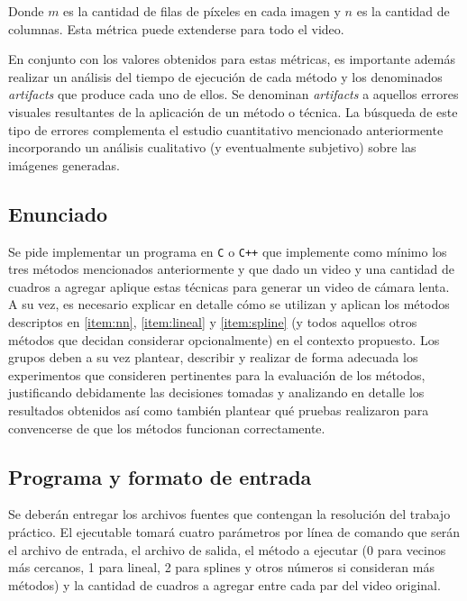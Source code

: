     Donde $m$ es la cantidad de filas de p\'ixeles en cada imagen y $n$ es la cantidad de columnas. Esta métrica puede extenderse para todo el video.

    En conjunto con los valores obtenidos para estas m\'etricas, es importante además realizar un an\'alisis del tiempo de ejecuci\'on de cada m\'etodo y los denominados \emph{artifacts} que produce cada uno de ellos. Se denominan \emph{artifacts} a aquellos errores visuales resultantes de la aplicaci\'on de un m\'etodo o t\'ecnica. La b\'usqueda de este tipo de errores complementa el estudio cuantitativo mencionado anteriormente incorporando un an\'alisis cualitativo (y eventualmente subjetivo) sobre las im\'agenes generadas.

    \vskip 5pt

    \subsection{Enunciado}

    Se pide implementar un programa en \verb-C- o \verb-C++- que implemente como m\'inimo los tres m\'etodos mencionados anteriormente y que dado un video y una cantidad de cuadros a agregar aplique estas t\'ecnicas para generar un video de cámara lenta. A su vez, es necesario explicar en detalle c\'omo se utilizan y aplican los m\'etodos descriptos en \ref{item:nn}, \ref{item:lineal} y \ref{item:spline} (y todos aquellos otros m\'etodos que decidan considerar opcionalmente) en el contexto propuesto. Los grupos deben a su vez plantear, describir y realizar de forma adecuada los experimentos que consideren pertinentes para la evaluaci\'on de los m\'etodos, justificando debidamente las decisiones tomadas y analizando en detalle los resultados obtenidos as\'i como tambi\'en plantear qu\'e pruebas realizaron para convencerse de que los m\'etodos funcionan correctamente.


    \subsection{Programa y formato de entrada}

    Se deberán entregar los archivos fuentes que contengan la resolución del trabajo práctico. El ejecutable tomará cuatro parámetros por línea de comando que serán el archivo de entrada, el archivo de salida, el método a ejecutar (0 para vecinos más cercanos, 1 para lineal, 2 para splines y otros números si consideran más métodos) y la cantidad de cuadros a agregar entre cada par del video original.

